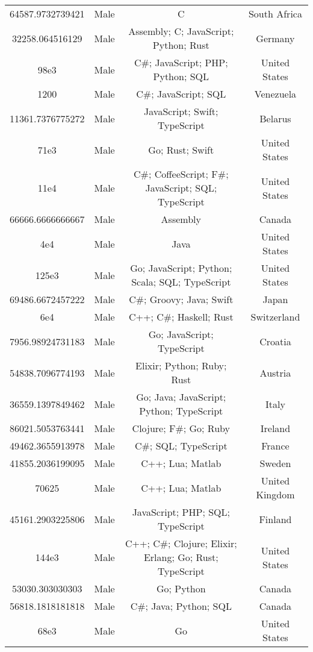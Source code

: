 \begin{center}
\begin{tabular}{ |c|c|c|c| }
64587.9732739421  &  Male  &  C  &  South Africa  \\ 
32258.064516129  &  Male  &  Assembly; C; JavaScript; Python; Rust  &  Germany  \\ 
98e3  &  Male  &  C\#; JavaScript; PHP; Python; SQL  &  United States  \\ 
1200  &  Male  &  C\#; JavaScript; SQL  &  Venezuela  \\ 
11361.7376775272  &  Male  &  JavaScript; Swift; TypeScript  &  Belarus  \\ 
71e3  &  Male  &  Go; Rust; Swift  &  United States  \\ 
11e4  &  Male  &  C\#; CoffeeScript; F\#; JavaScript; SQL; TypeScript  &  United States  \\ 
66666.6666666667  &  Male  &  Assembly  &  Canada  \\ 
4e4  &  Male  &  Java  &  United States  \\ 
125e3  &  Male  &  Go; JavaScript; Python; Scala; SQL; TypeScript  &  United States  \\ 
69486.6672457222  &  Male  &  C\#; Groovy; Java; Swift  &  Japan  \\ 
6e4  &  Male  &  C++; C\#; Haskell; Rust  &  Switzerland  \\ 
7956.98924731183  &  Male  &  Go; JavaScript; TypeScript  &  Croatia  \\ 
54838.7096774193  &  Male  &  Elixir; Python; Ruby; Rust  &  Austria  \\ 
36559.1397849462  &  Male  &  Go; Java; JavaScript; Python; TypeScript  &  Italy  \\ 
86021.5053763441  &  Male  &  Clojure; F\#; Go; Ruby  &  Ireland  \\ 
49462.3655913978  &  Male  &  C\#; SQL; TypeScript  &  France  \\ 
41855.2036199095  &  Male  &  C++; Lua; Matlab  &  Sweden  \\ 
70625  &  Male  &  C++; Lua; Matlab  &  United Kingdom  \\ 
45161.2903225806  &  Male  &  JavaScript; PHP; SQL; TypeScript  &  Finland  \\ 
144e3  &  Male  &  C++; C\#; Clojure; Elixir; Erlang; Go; Rust; TypeScript  &  United States  \\ 
53030.303030303  &  Male  &  Go; Python  &  Canada  \\ 
56818.1818181818  &  Male  &  C\#; Java; Python; SQL  &  Canada  \\ 
68e3  &  Male  &  Go  &  United States  \\ 

\end{tabular}
\end{center}
